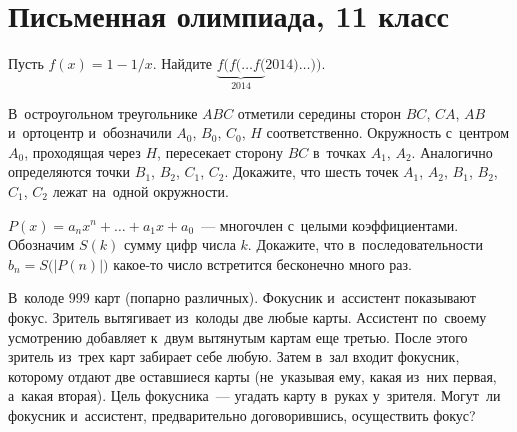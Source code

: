 

\section*{Письменная олимпиада, 11 класс}


\begin{problems}

\item
Пусть $f(x) = 1 - 1 / x$.
Найдите $\underbrace{f(f( \ldots f(}_{2014}2014)\ldots))$.

\item
В~остроугольном треугольнике $ABC$ отметили середины сторон $BC$, $CA$, $AB$
и~ортоцентр и~обозначили $A_0$, $B_0$, $C_0$, $H$ соответственно.
Окружность с~центром $A_0$, проходящая через $H$, пересекает сторону $BC$
в~точках $A_1$, $A_2$.
Аналогично определяются точки $B_1$, $B_2$, $C_1$, $C_2$.
Докажите, что шесть точек $A_1$, $A_2$, $B_1$, $B_2$, $C_1$, $C_2$ лежат
на~одной окружности.

\item
$P(x) = a_n x^n + \ldots + a_1 x + a_0$~--- многочлен с~целыми коэффициентами.
Обозначим $S(k)$ сумму цифр числа $k$.
Докажите, что в~последовательности $b_n = S\bigl(|P(n)|\bigr)$ какое-то число встретится
бесконечно много раз.

\item
В~колоде $999$ карт (попарно различных).
Фокусник и~ассистент показывают фокус.
Зритель вытягивает из~колоды две любые карты.
Ассистент по~своему усмотрению добавляет к~двум вытянутым картам еще третью.
После этого зритель из~трех карт забирает себе любую.
Затем в~зал входит фокусник, которому отдают две оставшиеся карты
(не~указывая ему, какая из~них первая, а~какая вторая).
Цель фокусника~--- угадать карту в~руках у~зрителя.
Могут~ли фокусник и~ассистент, предварительно договорившись, осуществить фокус?

\end{problems}

